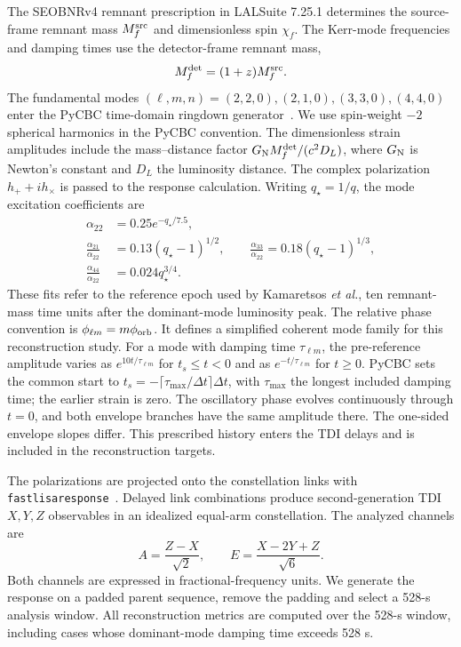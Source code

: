\documentclass[10pt,prd,aps,a4paper,twocolumn,superscriptaddress,nofootinbib,floatfix]{revtex4-2}
\begin{document}
The SEOBNRv4 remnant prescription in LALSuite 7.25.1 determines the source-frame remnant mass $M_f^{\rm src}$ and dimensionless spin $\chi_f$. The Kerr-mode frequencies and damping times use the detector-frame remnant mass,
\begin{equation}
M_f^{\rm det}=(1+z)M_f^{\rm src}.
\end{equation}
The fundamental modes $(\ell,m,n)=(2,2,0),(2,1,0),(3,3,0),(4,4,0)$ enter the PyCBC time-domain ringdown generator~\cite{berti2006gravitational,berti2009qnm,PyCBCRingdown}. We use spin-weight $-2$ spherical harmonics in the PyCBC convention. The dimensionless strain amplitudes include the mass--distance factor $G_{\rm N}M_f^{\rm det}/(c^2D_L)$, where $G_{\rm N}$ is Newton's constant and $D_L$ the luminosity distance. The complex polarization $h_++ih_\times$ is passed to the response calculation. Writing $q_\star=1/q$, the mode excitation coefficients are~\cite{Kamaretsos2012}
\begin{align}
\alpha_{22}&=0.25e^{-q_\star/7.5},\nonumber\\
\frac{\alpha_{21}}{\alpha_{22}}&=0.13(q_\star-1)^{1/2},\qquad
\frac{\alpha_{33}}{\alpha_{22}}=0.18(q_\star-1)^{1/3},\nonumber\\
\frac{\alpha_{44}}{\alpha_{22}}&=0.024q_\star^{3/4}.
\end{align}
These fits refer to the reference epoch used by Kamaretsos \textit{et al.}, ten remnant-mass time units after the dominant-mode luminosity peak. The relative phase convention is $\phi_{\ell m}=m\phi_{\rm orb}$. It defines a simplified coherent mode family for this reconstruction study. For a mode with damping time $\tau_{\ell m}$, the pre-reference amplitude varies as $e^{10t/\tau_{\ell m}}$ for $t_s\le t<0$ and as $e^{-t/\tau_{\ell m}}$ for $t\ge0$. PyCBC sets the common start to $t_s=-\lceil\tau_{\max}/\Delta t\rceil\Delta t$, with $\tau_{\max}$ the longest included damping time; the earlier strain is zero. The oscillatory phase evolves continuously through $t=0$, and both envelope branches have the same amplitude there. The one-sided envelope slopes differ. This prescribed history enters the TDI delays and is included in the reconstruction targets.

The polarizations are projected onto the constellation links with \texttt{fastlisaresponse}~\cite{Katz2022Response}. Delayed link combinations produce second-generation TDI $X,Y,Z$ observables in an idealized equal-arm constellation. The analyzed channels are
\begin{equation}
A=\frac{Z-X}{\sqrt{2}},\qquad E=\frac{X-2Y+Z}{\sqrt{6}}.\label{eq:aet_convention}
\end{equation}
Both channels are expressed in fractional-frequency units. We generate the response on a padded parent sequence, remove the padding and select a 528-s analysis window. All reconstruction metrics are computed over the 528-s window, including cases whose dominant-mode damping time exceeds 528 s.
\end{document}
